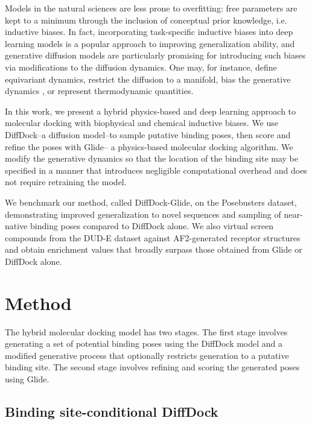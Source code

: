 \documentclass[%
 aip,
 amsmath,amssymb,
reprint,%
]{revtex4-1}
\begin{document}
Models in the natural sciences are less prone to overfitting: free parameters are kept to a minimum through the inclusion of conceptual prior knowledge, i.e. inductive biases.\cite{mitchell1980need} In fact, incorporating task-specific inductive biases into deep learning models is a popular approach to improving generalization ability\cite{fuchs2020equivariance,musaelian2023allegro}, and generative diffusion models are particularly promising for introducing such biases via modifications to the diffusion dynamics. One may, for instance, define equivariant dynamics\cite{hoogeboom2022equivariant}, restrict the diffusion to a manifold\cite{jing2022torsional,de2022riemannian}, bias the generative dynamics \cite{corso2023particle}, or represent thermodynamic quantities.\cite{herron2024inferring,exptm}


In this work, we present a hybrid physics-based and deep learning approach to molecular docking with biophysical and chemical inductive biases. We use DiffDock\cite{corso2022diffdock}--a diffusion model--to sample putative binding poses, then score and refine the poses with Glide\cite{friesner2004glide}-- a physics-based molecular docking algorithm. We modify the generative dynamics so that the location of the binding site may be specified in a manner that introduces negligible computational overhead and does not require retraining the model.

We benchmark our method, called DiffDock-Glide, on the Posebusters dataset, demonstrating improved generalization to novel sequences and sampling of near-native binding poses compared to DiffDock alone. We also virtual screen compounds from the DUD-E\cite{mysinger2012dude} dataset against AF2-generated receptor structures and obtain enrichment values that broadly surpass those obtained from Glide or DiffDock alone.

\section{Method}


The hybrid molecular docking model has two stages. The first stage involves generating a set of potential binding poses using the DiffDock model and a modified generative process that optionally restricts generation to a putative binding site. The second stage involves refining and scoring the generated poses using Glide. 

\subsection{Binding site-conditional DiffDock}
\end{document}
